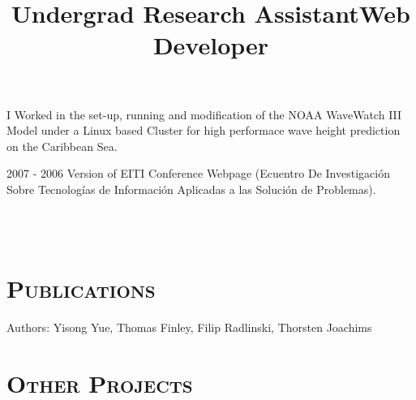 \begin{resume}
\title{\textbf{Undergrad Research Assistant}}
\begin{position}
I Worked in the set-up, running and modification of the NOAA WaveWatch III Model under a Linux based Cluster
for high performace wave height prediction on the Caribbean Sea.
\end{position}

\title{\textbf{Web Developer}}
\begin{position}
2007 - 2006 Version of EITI Conference Webpage (Ecuentro De Investigaci\'{o}n Sobre Tecnologías de Informaci\'{o}n Aplicadas a las Soluci\'{o}n de Problemas).
\end{position}
\newline



\begin{formatb}
  \\
  \body\\
\end{formatb}

\section{\textsc{Publications}}

\begin{position}
Authors: Yisong Yue, Thomas Finley, Filip Radlinski, Thorsten Joachims
\end{position}

\section{\textsc{Other Projects}}


\end{resume}
